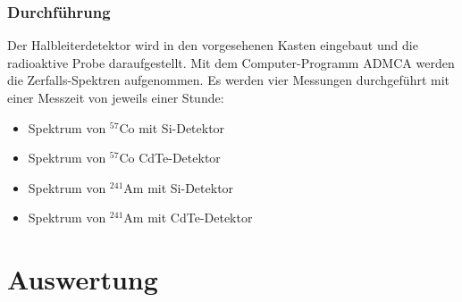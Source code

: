 \documentclass[12pt]{article}
\begin{document}
\subsubsection{Durchführung}

Der Halbleiterdetektor wird in den vorgesehenen Kasten eingebaut und die radioaktive Probe daraufgestellt. Mit dem Computer-Programm ADMCA werden die Zerfalls-Spektren aufgenommen. Es werden vier Messungen durchgeführt mit einer Messzeit von jeweils einer Stunde:

\begin{itemize}
	\item Spektrum von $^{57}$Co mit Si-Detektor
	\item Spektrum von $^{57}$Co  CdTe-Detektor
	\item Spektrum von $^{241}$Am  mit Si-Detektor
	\item Spektrum von $^{241}$Am mit CdTe-Detektor
\end{itemize} 


\newpage
\section{Auswertung}
\end{document}
